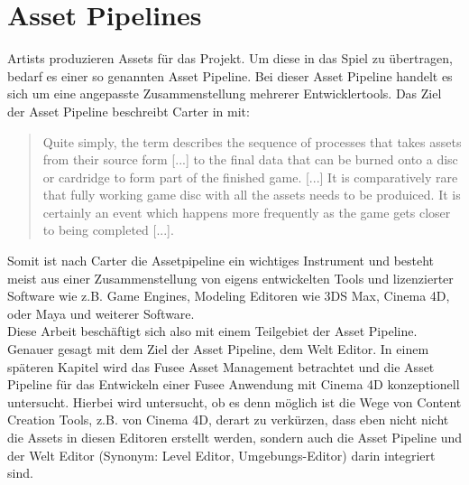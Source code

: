 \documentclass[pagesize, paper=a4, fontsize=12pt, titlepage=true, headings=small, headnosepline, abstractoff, liststotoc, nochapterprefix, plainheadsepline, twoside]{scrreprt}
\begin{document}
\section{Asset Pipelines}
Artists produzieren Assets für das Projekt. Um diese in das Spiel zu übertragen, bedarf es einer so genannten Asset Pipeline. Bei dieser Asset Pipeline handelt es sich um eine angepasste Zusammenstellung mehrerer Entwicklertools. Das Ziel der Asset Pipeline beschreibt Carter in  mit:
\begin{quote}
\glqq Quite simply, the term describes the sequence of processes that takes assets from their source form [...] to the final data that can be burned onto a disc or cardridge to form part of the finished game.
[...]
It is comparatively rare that fully working game disc with all the assets needs to be produiced. It is certainly an event which happens more frequently as the game gets closer to being completed [...].\grqq{} 
\end{quote}
Somit ist nach Carter die Assetpipeline ein wichtiges Instrument und besteht meist aus einer Zusammenstellung von eigens entwickelten Tools und lizenzierter Software wie z.B. Game Engines, Modeling Editoren wie 3DS Max, Cinema 4D, oder Maya und weiterer Software.\\
Diese Arbeit beschäftigt sich also mit einem Teilgebiet der Asset Pipeline. Genauer gesagt mit dem Ziel der Asset Pipeline, dem Welt Editor. In einem späteren Kapitel wird das Fusee Asset Management betrachtet und die Asset Pipeline für das Entwickeln einer Fusee Anwendung mit Cinema 4D konzeptionell untersucht. Hierbei wird untersucht, ob es denn möglich ist die Wege von Content Creation Tools, z.B. von Cinema 4D, derart zu verkürzen, dass eben nicht nicht die Assets in diesen Editoren erstellt werden, sondern auch die Asset Pipeline und der Welt Editor (Synonym: Level Editor, Umgebungs-Editor) darin integriert sind.
\end{document}
